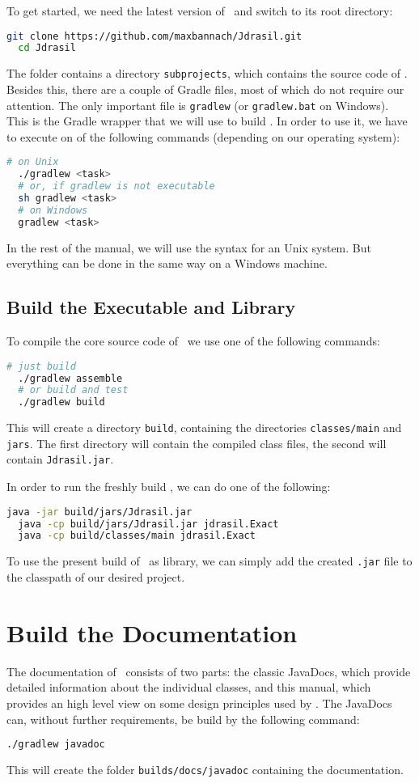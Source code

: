 \documentclass[a4paper, ukenglish, twoside, openright]{jdrasilmanual}
\begin{document}
To get started, we need the latest version of \Jdrasil\ and switch to
its root directory:
\begin{lstlisting}[language=bash]
  git clone https://github.com/maxbannach/Jdrasil.git
  cd Jdrasil
\end{lstlisting}
The folder contains a directory \texttt{subprojects}, which contains
the source code of \Jdrasil. Besides this, there are a couple of Gradle
files, most of which do not require our attention. The only important
file is \lstinline{gradlew} (or \lstinline{gradlew.bat} on
Windows). This is the Gradle wrapper that we will use to build \Jdrasil.
In order to use it, we have to execute on of the following commands
(depending on our operating system):
\begin{lstlisting}[language=bash]
  # on Unix
  ./gradlew <task>
  # or, if gradlew is not executable
  sh gradlew <task>
  # on Windows
  gradlew <task>
\end{lstlisting}
In the rest of the manual, we will use the syntax for an Unix
system. But everything can be done in the same way on a Windows machine.

\subsection{Build the Executable and Library}
To compile the core source code of \Jdrasil\ we use one of the following
commands:
\begin{lstlisting}[language=bash]
  # just build
  ./gradlew assemble
  # or build and test
  ./gradlew build
\end{lstlisting}
This will create a directory \texttt{build}, containing the
directories \texttt{classes/main} and \texttt{jars}. The first
directory will contain the compiled class files, the second will
contain \texttt{Jdrasil.jar}.

In order to run the freshly build \Jdrasil, we can do one of the
following:
\begin{lstlisting}[language=bash]
  java -jar build/jars/Jdrasil.jar
  java -cp build/jars/Jdrasil.jar jdrasil.Exact
  java -cp build/classes/main jdrasil.Exact
\end{lstlisting}
To use the present build of \Jdrasil\ as library, we can simply add
the created \texttt{.jar} file to the classpath of our desired
project.
\section{Build the Documentation}
The documentation of \Jdrasil\ consists of two parts: the classic
JavaDocs, which provide detailed information about the individual
classes, and this manual, which provides an high level view on some
design principles used by \Jdrasil. The JavaDocs can, without further
requirements, be build by the following command:
\begin{lstlisting}[language=bash]
  ./gradlew javadoc
\end{lstlisting}
This will create the folder \texttt{builds/docs/javadoc} containing
the documentation.
\end{document}
